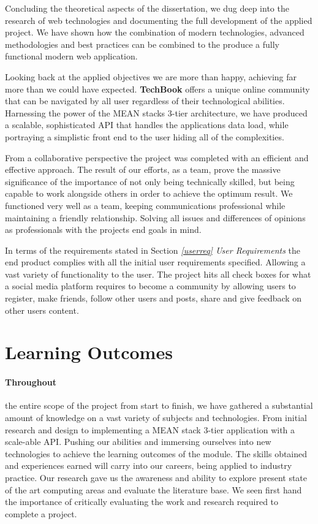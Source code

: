 Concluding the theoretical aspects of the dissertation, we dug deep into the research of web technologies and documenting the full development of the applied project. We have shown how the combination of modern technologies, advanced methodologies and best practices can be combined to the produce a fully functional modern web application.

Looking back at the applied objectives we are more than happy, achieving far more than we could have expected. \textbf{TechBook} offers a unique online community that can be navigated by all user regardless of their technological abilities. Harnessing the power of the MEAN stacks 3-tier architecture, we have produced a scalable, sophisticated API that handles the applications data load, while portraying a simplistic front end to the user hiding all of the complexities. 

From a collaborative perspective the project was completed with an efficient and effective approach. The result of our efforts, as a team, prove the massive significance of the importance of not only being technically skilled, but being capable to work alongside others in order to achieve the optimum result. We functioned very well as a team, keeping communications professional while maintaining a friendly relationship. Solving all issues and differences of opinions as professionals with the projects end goals in mind. 

In terms  of the requirements stated in Section \textit{\ref{userreq} User Requirements} the end product complies with all the initial user requirements specified. Allowing a vast variety of functionality to the user. The project hits all check boxes for what a social media platform requires to become a community by allowing users to register, make friends, follow other users and posts, share and give feedback on other users content.

\section{Learning Outcomes}
\paragraph{Throughout} the entire scope of the project from start to finish, we have gathered a substantial amount of knowledge on a vast variety of subjects and technologies. From initial research and design to implementing a MEAN stack 3-tier application with a scale-able API.  Pushing our abilities and immersing ourselves into new technologies to achieve the learning outcomes of the module. The skills obtained and experiences earned will carry into our careers, being applied to industry practice. Our research gave us the awareness and ability to explore present state of the art computing areas and evaluate the literature base. We seen first hand the importance of critically evaluating the work and research required to complete a project.

